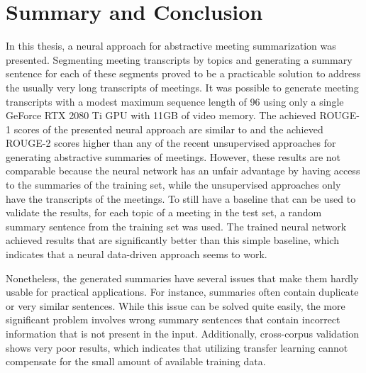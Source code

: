 \chapter{Summary and Conclusion}\label{ch:summary-and-conclusion}

In this thesis, a neural approach for abstractive meeting summarization was presented.
Segmenting meeting transcripts by topics and generating a summary sentence for each of these segments proved to be a practicable solution to address the usually very long transcripts of meetings.
It was possible to generate meeting transcripts with a modest maximum sequence length of 96 using only a single GeForce RTX 2080 Ti GPU with 11GB of video memory.
The achieved ROUGE-1 scores of the presented neural approach are similar to and the achieved ROUGE-2 scores higher than any of the recent unsupervised approaches for generating abstractive summaries of meetings.
However, these results are not comparable because the neural network has an unfair advantage by having access to the summaries of the training set, while the unsupervised approaches only have the transcripts of the meetings.
To still have a baseline that can be used to validate the results, for each topic of a meeting in the test set, a random summary sentence from the training set was used.
The trained neural network achieved results that are significantly better than this simple baseline, which indicates that a neural data-driven approach seems to work.

Nonetheless, the generated summaries have several issues that make them hardly usable for practical applications.
For instance, summaries often contain duplicate or very similar sentences.
While this issue can be solved quite easily, the more significant problem involves wrong summary sentences that contain incorrect information that is not present in the input.
Additionally, cross-corpus validation shows very poor results, which indicates that utilizing transfer learning cannot compensate for the small amount of available training data.


